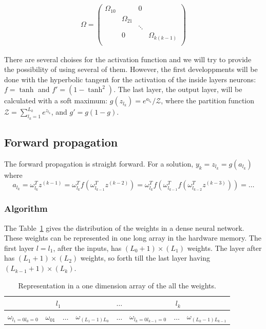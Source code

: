 \documentclass[final, paper=letter,5p,times,twocolumn]{elsarticle}
\begin{document}
\begin{eqnarray*}
  \Omega = \left(
  \begin{array}{cccc}
    \Omega_{10} &            & 0      &  \\
               & \Omega_{21} &        &  \\
               &            & \ddots &  \\
               & 0          &        & \Omega_{k(k-1)} \\
  \end{array}
  \right)
\end{eqnarray*}

  There are several choises for the activation function and we will try to provide the possibility of using several of them. However, the first developpments will be done with the hyperbolic tangent for the activation of the inside layers neurons: $f = \tanh$ and $f' = (1 - \tanh^{2})$. The last layer, the output layer, will be calculated with a soft maximum: $g(z_{l_{k}}) = e^{a_{l_{k}}} / \mathcal{Z}$, where the partition function $\mathcal{Z} = \sum_{l_{k} = 1}^{L_{k}} e^{z_{l_{k}}}$, and $g' = g(1 - g)$.
  
\subsection{Forward propagation}

The forward propagation is straight forward. For a solution, $y_{k} = z_{l_{k}} = g(a_{l_{k}})$ where
$$
a_{l_{k}} = \omega_{l_{k}}^{T} z^{(k-1)} = \omega_{l_{k}}^{T} f(\omega_{l_{k-1}}^{T} z^{(k-2)}) = \omega_{l_{k}}^{T} f(\omega_{l_{k-1}}^{T} f(\omega_{l_{k-2}}^{T} z^{(k-3)})) = \dots
$$

\subsubsection{Algorithm}

The Table~\ref{weights_in_mem} gives the distribution of the weights in a dense neural network. These weights can be represented in one long array in the hardware memory. The first layer $l = l_{1}$, after the inputs, has $(L_{0}+1)\times(L_{1})$ weights. The layer after has $(L_{1}+1)\times(L_{2})$ weights, so forth till the last layer having $(L_{k-1}+1)\times(L_{k})$.


\begin{table}[]
\centering
\caption{Representation in a one dimension array of the all the weights.}
\label{weights_in_mem}
\begin{tabular}{|c|c|c|c|c|c|c|c|}
\hline
\multicolumn{4}{|c|}{$l_{1}$} & $\hdots$ & \multicolumn{3}{c|}{$l_{k}$} \\ \hline
$\omega_{l_{1}=0l_{0}=0}$   &   $\omega_{01}$   & $\hdots$  &  $\omega_{(L_{1}-1)L_{0}}$   & $\hdots$ &    $\omega_{l_{k}=0l_{k-1}=0}$    & $\hdots$  &   $\omega_{(L_{k}-1)L_{k-1}}$ \\ \hline
\end{tabular}
\end{table}
\end{document}
